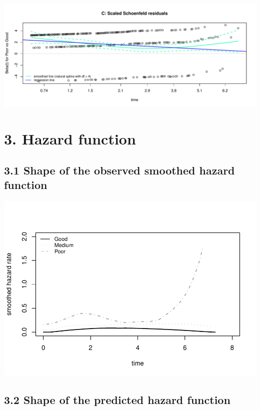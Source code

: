 \documentclass[
]{article}
\begin{document}
\begin{flushleft}\includegraphics[height=0.29\textheight]{BC_OS_output/Images/Figure_PH_assumption-3} \end{flushleft}

\clearpage

\section{3. Hazard function}\label{hazard-function}

\subsection{3.1 Shape of the observed smoothed hazard
function}\label{shape-of-the-observed-smoothed-hazard-function}

\begin{flushleft}\includegraphics{BC_OS_output/Images/Figure_plot_hr-1} \end{flushleft}

\clearpage

\subsection{3.2 Shape of the predicted hazard
function}\label{shape-of-the-predicted-hazard-function}
\end{document}
